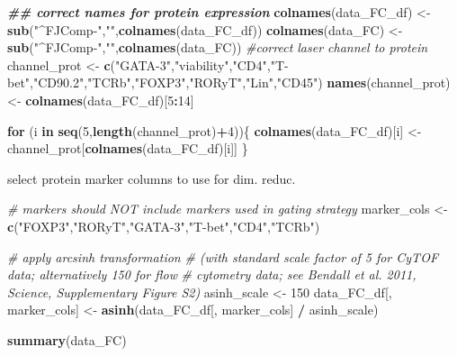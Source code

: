 \documentclass[
]{article}
\newenvironment{Shaded}{\begin{snugshade}}{\end{snugshade}}
\newcommand{\CommentTok}[1]{\textcolor[rgb]{0.56,0.35,0.01}{\textit{#1}}}
\newcommand{\ControlFlowTok}[1]{\textcolor[rgb]{0.13,0.29,0.53}{\textbf{#1}}}
\newcommand{\DecValTok}[1]{\textcolor[rgb]{0.00,0.00,0.81}{#1}}
\newcommand{\DocumentationTok}[1]{\textcolor[rgb]{0.56,0.35,0.01}{\textbf{\textit{#1}}}}
\newcommand{\FunctionTok}[1]{\textcolor[rgb]{0.13,0.29,0.53}{\textbf{#1}}}
\newcommand{\NormalTok}[1]{#1}
\newcommand{\OtherTok}[1]{\textcolor[rgb]{0.56,0.35,0.01}{#1}}
\newcommand{\SpecialCharTok}[1]{\textcolor[rgb]{0.81,0.36,0.00}{\textbf{#1}}}
\newcommand{\StringTok}[1]{\textcolor[rgb]{0.31,0.60,0.02}{#1}}
\begin{document}
\begin{Shaded}
\begin{Highlighting}[]
\DocumentationTok{\#\# correct names for protein expression}
\FunctionTok{colnames}\NormalTok{(data\_FC\_df) }\OtherTok{\textless{}{-}} \FunctionTok{sub}\NormalTok{(}\StringTok{"\^{}FJComp{-}"}\NormalTok{,}\StringTok{""}\NormalTok{,}\FunctionTok{colnames}\NormalTok{(data\_FC\_df))}
\FunctionTok{colnames}\NormalTok{(data\_FC) }\OtherTok{\textless{}{-}} \FunctionTok{sub}\NormalTok{(}\StringTok{"\^{}FJComp{-}"}\NormalTok{,}\StringTok{""}\NormalTok{,}\FunctionTok{colnames}\NormalTok{(data\_FC))}
\CommentTok{\#correct laser channel to protein}
\NormalTok{channel\_prot }\OtherTok{\textless{}{-}} \FunctionTok{c}\NormalTok{(}\StringTok{"GATA{-}3"}\NormalTok{,}\StringTok{"viability"}\NormalTok{,}\StringTok{"CD4"}\NormalTok{,}\StringTok{"T{-}bet"}\NormalTok{,}\StringTok{"CD90.2"}\NormalTok{,}\StringTok{"TCRb"}\NormalTok{,}\StringTok{"FOXP3"}\NormalTok{,}\StringTok{"RORyT"}\NormalTok{,}\StringTok{"Lin"}\NormalTok{,}\StringTok{"CD45"}\NormalTok{)}
\FunctionTok{names}\NormalTok{(channel\_prot) }\OtherTok{\textless{}{-}} \FunctionTok{colnames}\NormalTok{(data\_FC\_df)[}\DecValTok{5}\SpecialCharTok{:}\DecValTok{14}\NormalTok{]}

\ControlFlowTok{for}\NormalTok{ (i }\ControlFlowTok{in} \FunctionTok{seq}\NormalTok{(}\DecValTok{5}\NormalTok{,}\FunctionTok{length}\NormalTok{(channel\_prot)}\SpecialCharTok{+}\DecValTok{4}\NormalTok{))\{}
  \FunctionTok{colnames}\NormalTok{(data\_FC\_df)[i] }\OtherTok{\textless{}{-}}\NormalTok{ channel\_prot[}\FunctionTok{colnames}\NormalTok{(data\_FC\_df)[i]]}
\NormalTok{\}}
\end{Highlighting}
\end{Shaded}

select protein marker columns to use for dim. reduc.

\begin{Shaded}
\begin{Highlighting}[]
\CommentTok{\# markers should NOT include markers used in gating strategy }
\NormalTok{marker\_cols }\OtherTok{\textless{}{-}} \FunctionTok{c}\NormalTok{(}\StringTok{"FOXP3"}\NormalTok{,}\StringTok{"RORyT"}\NormalTok{,}\StringTok{"GATA{-}3"}\NormalTok{,}\StringTok{"T{-}bet"}\NormalTok{,}\StringTok{"CD4"}\NormalTok{,}\StringTok{"TCRb"}\NormalTok{)}

\CommentTok{\# apply arcsinh transformation}
\CommentTok{\# (with standard scale factor of 5 for CyTOF data; alternatively 150 for flow }
\CommentTok{\# cytometry data; see Bendall et al. 2011, Science, Supplementary Figure S2)}
\NormalTok{asinh\_scale }\OtherTok{\textless{}{-}} \DecValTok{150}
\NormalTok{data\_FC\_df[, marker\_cols] }\OtherTok{\textless{}{-}} \FunctionTok{asinh}\NormalTok{(data\_FC\_df[, marker\_cols] }\SpecialCharTok{/}\NormalTok{ asinh\_scale)}

\FunctionTok{summary}\NormalTok{(data\_FC)}
\end{Highlighting}
\end{Shaded}
\end{document}

